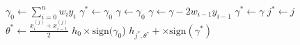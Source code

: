 \begin{algorithm}[htpb]
	\caption{}
	\label{alg:dstumps}
	\begin{algorithmic}[1]
		\State $\gamma_{0} \gets \sum_{i=0}^{n}w_{i}y_{i}$
		\State $\gamma^{*} \gets \gamma_{0}$
			\State $\gamma \gets \gamma_{0}$
				\State $\gamma \gets \gamma - 2w_{i-1}y_{i-1}$
					\If{$|\gamma| > |\gamma^{*}|$}
						\State $\gamma^{*} \gets \gamma$
						\State $j^{*} \gets j$
						\State $\theta^{*} \gets \frac{x_{i}^{(j)} + x_{i-1}^{(j)}}{2}$
					\EndIf
				\EndIf
			\EndFor
		\EndFor
		\If{$\gamma^{*} = \gamma$}
			\Return $h_{0}\times\text{sign}(\gamma_{0}$)
		\Else
			\Return $h_{j^{*},\theta^{*}}+\times\text{sign}(\gamma^{*})$
		\EndIf
		\EndProcedure
	\end{algorithmic}
\end{algorithm}



